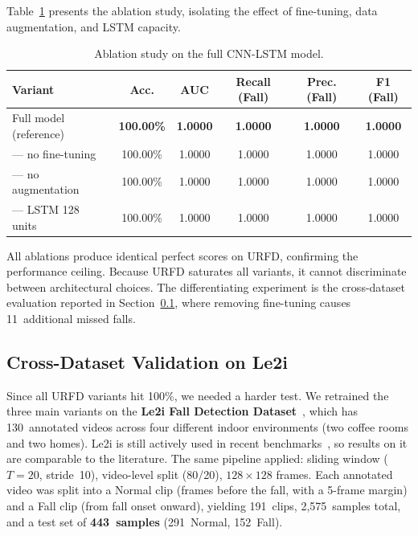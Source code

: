 \documentclass[runningheads]{llncs}
\begin{document}
Table~\ref{tab:ablation} presents the ablation study, isolating the effect of fine-tuning, data augmentation, and LSTM capacity.

\begin{table}
\centering
\caption{Ablation study on the full CNN-LSTM model.}\label{tab:ablation}
\begin{tabular}{|l|c|c|c|c|c|}
\hline
\textbf{Variant} & \textbf{Acc.} & \textbf{AUC} & \textbf{Recall (Fall)} & \textbf{Prec. (Fall)} & \textbf{F1 (Fall)} \\
\hline
Full model (reference)  & \textbf{100.00\%} & \textbf{1.0000} & \textbf{1.0000} & \textbf{1.0000} & \textbf{1.0000} \\
--- no fine-tuning      & 100.00\% & 1.0000 & 1.0000 & 1.0000 & 1.0000 \\
--- no augmentation     & 100.00\% & 1.0000 & 1.0000 & 1.0000 & 1.0000 \\
--- LSTM 128 units      & 100.00\% & 1.0000 & 1.0000 & 1.0000 & 1.0000 \\
\hline
\end{tabular}
\end{table}

\noindent All ablations produce identical perfect scores on URFD, confirming the performance ceiling. Because URFD saturates all variants, it cannot discriminate between architectural choices. The differentiating experiment is the cross-dataset evaluation reported in Section~\ref{sec:le2i}, where removing fine-tuning causes 11~additional missed falls.

\subsection{Cross-Dataset Validation on Le2i}\label{sec:le2i}

Since all URFD variants hit 100\%, we needed a harder test. We retrained the three main variants on the \textbf{Le2i Fall Detection Dataset}~\cite{charfi2013}, which has 130~annotated videos across four different indoor environments (two coffee rooms and two homes). Le2i is still actively used in recent benchmarks~\cite{alanazi2022,chakraborty2024}, so results on it are comparable to the literature. The same pipeline applied: sliding window ($T=20$, stride~10), video-level split (80/20), $128\times128$ frames. Each annotated video was split into a Normal clip (frames before the fall, with a 5-frame margin) and a Fall clip (from fall onset onward), yielding 191~clips, 2,575~samples total, and a test set of \textbf{443~samples} (291~Normal, 152~Fall).
\end{document}
